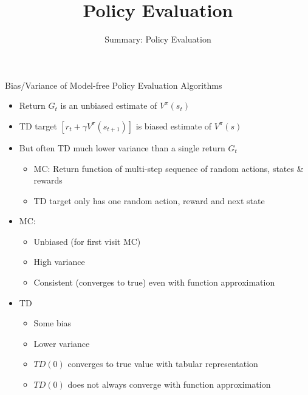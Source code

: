 


\title[Reinforcement Learning: Policy Evaluation]{Policy Evaluation}
\subtitle{Summary: Policy Evaluation}




	
	\maketitle

\begin{frame}[c]{Bias/Variance of Model-free Policy Evaluation Algorithms}

\begin{itemize}
	\item Return $G_t$ is an unbiased estimate of $V^\pi(s_t)$
	\item TD target $[r_t + \gamma V^\pi(s_{t+1})]$ is biased estimate of $V^\pi(s)$ 
	\item But often TD much lower variance than a single return $G_t$
	\begin{itemize}
		\item MC: Return function of multi-step sequence of random actions, states \& rewards
		\item TD target only has one random action, reward and next state
	\end{itemize}
	\pause
	\item MC:
	\begin{itemize}
		\item Unbiased (for first visit MC)
		\item High variance
		\item Consistent (converges to true) even with function approximation
	\end{itemize}
	\pause
	\item TD
	\begin{itemize}
		\item Some bias
		\item Lower variance
		\item $TD(0)$ converges to true value with tabular representation
		\item $TD(0)$ does not always converge with function approximation 
	\end{itemize}
\end{itemize}
	
\end{frame}
